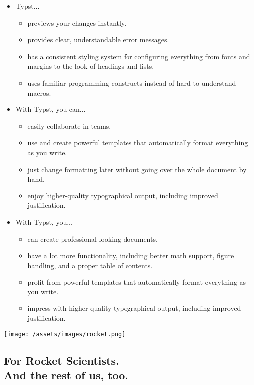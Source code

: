 \label{advantage}
\begin{itemize}
\tightlist
\item
  Typst...

  \begin{itemize}
  \tightlist
  \item
    previews your changes instantly.
  \item
    provides clear, understandable error messages.
  \item
    has a consistent styling system for configuring everything from
    fonts and margins to the look of headings and lists.
  \item
    uses familiar programming constructs instead of hard-to-understand
    macros.
  \end{itemize}
\item
  With Typst, you can...

  \begin{itemize}
  \tightlist
  \item
    easily collaborate in teams.
  \item
    use and create powerful templates that automatically format
    everything as you write.
  \item
    just change formatting later without going over the whole document
    by hand.
  \item
    enjoy higher-quality typographical output, including improved
    justification.
  \end{itemize}
\item
  With Typst, you...

  \begin{itemize}
  \tightlist
  \item
    can create professional-looking documents.
  \item
    have a lot more functionality, including better math support, figure
    handling, and a proper table of contents.
  \item
    profit from powerful templates that automatically format everything
    as you write.
  \item
    impress with higher-quality typographical output, including improved
    justification.
  \end{itemize}
\end{itemize}

\label{easy-to-learn}
\texttt{[image: /assets/images/rocket.png]}

\subsection{\texorpdfstring{For Rocket Scientists.\\
And the rest of us,
too.}{For Rocket Scientists. And the rest of us, too.}}\label{for-rocket-scientists.-and-the-rest-of-us-too.}

